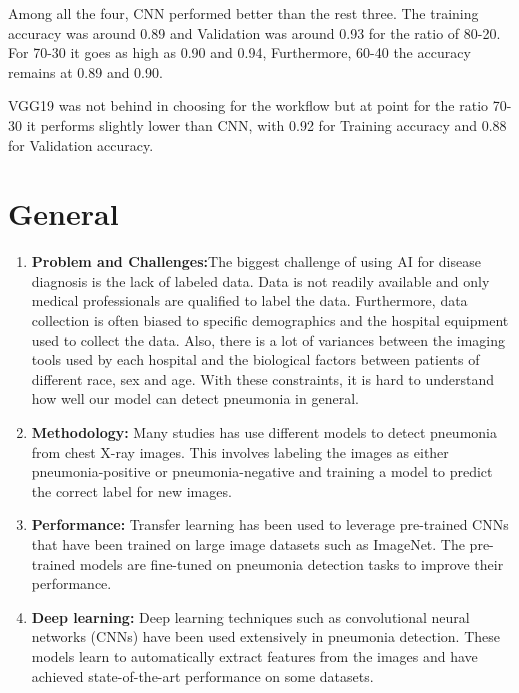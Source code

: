 Among all the four, CNN performed better than the rest three. The training accuracy was around 0.89 and Validation was around 0.93 for the ratio of 80-20. For 70-30 it goes as high as 0.90 and 0.94, Furthermore, 60-40 the accuracy remains at 0.89 and 0.90.\\ \bigskip

VGG19 was not behind in choosing for the workflow but at point for the ratio 70-30 it performs slightly lower than CNN, with 0.92 for Training accuracy and 0.88 for Validation accuracy.\\ \bigskip


\section{General}

\begin{enumerate}
	
	\item \textbf{Problem and Challenges:}The biggest challenge of using AI for disease diagnosis is the lack of labeled data. Data is not readily available and only medical professionals are qualified to label the data. Furthermore, data collection is often biased to specific demographics and the hospital equipment used to collect the data. Also, there is a lot of variances between the imaging tools used by each hospital and the biological factors between patients of different race, sex and age. With these constraints, it is hard to understand how well our model can detect pneumonia in general.
	
	\item \textbf{Methodology:} Many studies has use different models to detect pneumonia from chest X-ray images. This involves labeling the images as either pneumonia-positive or pneumonia-negative and training a model to predict the correct label for new images.
	
	\item \textbf{Performance:} Transfer learning has been used to leverage pre-trained CNNs that have been trained on large image datasets such as ImageNet. The pre-trained models are fine-tuned on pneumonia detection tasks to improve their performance.
	
	\item \textbf{Deep learning:} Deep learning techniques such as convolutional neural networks (CNNs) have been used extensively in pneumonia detection. These models learn to automatically extract features from the images and have achieved state-of-the-art performance on some datasets.
	

\end{enumerate}
